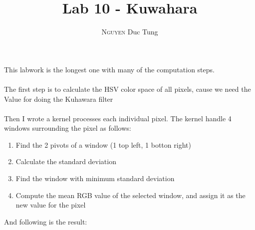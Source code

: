 \documentclass[12pt]{article}
\title{Lab 10 - Kuwahara}
\author{\textsc{Nguyen} Duc Tung}
\date{}
\begin{document}
\maketitle

This labwork is the longest one with many of the computation steps.
\\\\
The first step is to calculate the HSV color space of all pixels, cause we need the Value for doing the Kuhawara filter
\\\\
Then I wrote a kernel processes each individual pixel. The kernel handle 4 windows surrounding the pixel as follows:

\begin{enumerate}
  \item Find the 2 pivots of a window (1 top left, 1 botton right)
  \item Calculate the standard deviation
  \item Find the window with minimum standard deviation
  \item Compute the mean RGB value of the selected window, and assign it as the new value for the pixel
\end{enumerate}

And following is the result:
\end{document}
